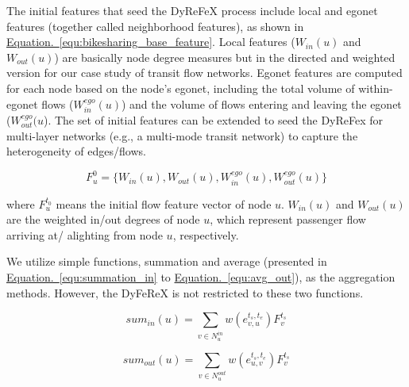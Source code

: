 \documentclass[a4paper,fleqn]{cas-sc}
\begin{document}
The initial features that seed the DyReFeX process include local and egonet features (together called neighborhood features), as shown in \hyperref[equ:bikesharing_base_feature]{Equation.~\ref{equ:bikesharing_base_feature}}. Local features ($W_{in}(u)$ and $W_{out}(u)$) are basically node degree measures but in the directed and weighted version for our case study of transit flow networks. Egonet features are computed for each node based on the node's egonet, including the total volume of within-egonet flows ($W_{in}^{ego}(u)$) and the volume of flows entering and leaving the egonet ($W_{out}^{ego}(u$). The set of initial features can be extended to seed the DyReFex for multi-layer networks (e.g., a multi-mode transit network) to capture the heterogeneity of edges/flows.




\begin{equation}
F_{u}^{0} = \{W_{in}(u), W_{out}(u), W_{in}^{ego}(u), W_{out}^{ego}(u)\}
\label{equ:bikesharing_base_feature}
\end{equation}

where $F_{u}^{t_{0}}$ means the initial flow feature vector of node $u$. $W_{in}(u)$ and $W_{out}(u)$ are the weighted in/out degrees of node $u$, which represent passenger flow arriving at/ alighting from node $u$, respectively.

We utilize simple functions, summation and average (presented in \hyperref[equ:summation_in]{Equation.~\ref{equ:summation_in}} to \hyperref[equ:avg_out]{Equation.~\ref{equ:avg_out}}), as the aggregation methods. However, the DyFeReX is not restricted to these two functions.

\noindent\begin{minipage}{.5\linewidth}
\begin{equation}
sum_{in}(u) = \sum\limits_{v\in N_{u}^{in}}w(e_{v,u}^{t_{s},t_{e}})F_{v}^{t_{s}}
\label{equ:summation_in}
\end{equation}
\end{minipage}%
\begin{minipage}{.5\linewidth}
\begin{equation}
sum_{out}(u) = \sum\limits_{v\in N_{u}^{out}}w(e_{u,v}^{t_{s},t_{e}})F_{v}^{t_{s}}
\label{equ:summation_out}
\end{equation}
\end{minipage}
\end{document}
